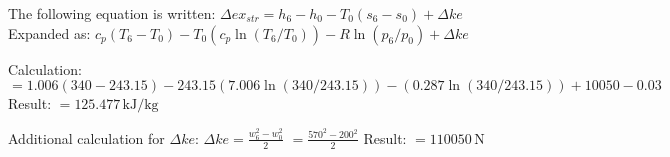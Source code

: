 The following equation is written:  
\( \Delta ex_{str} = h_6 - h_0 - T_0 \left( s_6 - s_0 \right) + \Delta ke \)  
Expanded as:  
\( c_p \left( T_6 - T_0 \right) - T_0 \left( c_p \ln \left( T_6 / T_0 \right) \right) - R \ln \left( p_6 / p_0 \right) + \Delta ke \)  

Calculation:  
\( = 1.006 \left( 340 - 243.15 \right) - 243.15 \left( 7.006 \ln \left( 340 / 243.15 \right) \right) - \left( 0.287 \ln \left( 340 / 243.15 \right) \right) + 10050 - 0.03 \)  
Result:  
\( = 125.477 \, \text{kJ/kg} \)  

Additional calculation for \( \Delta ke \):  
\( \Delta ke = \frac{w_6^2 - w_0^2}{2} \)  
\( = \frac{570^2 - 200^2}{2} \)  
Result:  
\( = 110050 \, \text{N} \)